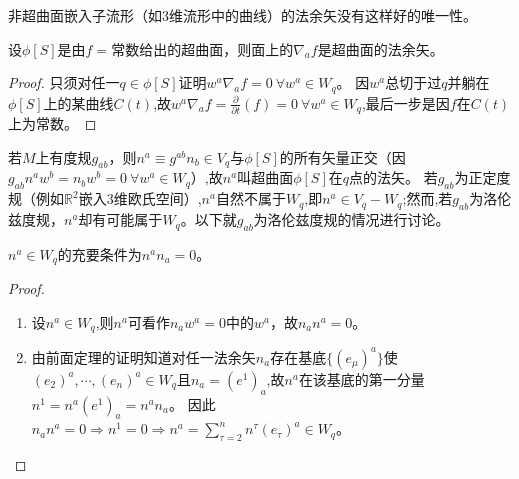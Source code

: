 \begin{note}
	非超曲面嵌入子流形（如$3$维流形中的曲线）的法余矢没有这样好的唯一性。
\end{note}

\begin{theorem}
	设$\phi[S]$是由$f = \text{常数}$给出的超曲面，则面上的$\nabla_af$是超曲面的法余矢。
\end{theorem}

\begin{proof}
	只须对任一$q \in \phi[S]$证明$w^a\nabla_af = 0 ~ \forall w^a \in W_q$。
	因$w^a$总切于过$q$并躺在$\phi[S]$上的某曲线$C(t)$,故$w^a\nabla_af = \frac{\partial}{\partial t}(f) = 0 ~ \forall w^a \in W_q$,最后一步是因$f$在$C(t)$上为常数。
\end{proof}

若$M$上有度规$g_{ab}$，则$n^a \equiv g^{ab}n_b \in V_q$与$\phi[S]$的所有矢量正交（因$g_{ab}n^aw^b = n_bw^b = 0 ~ \forall w^a \in W_q$）,故$n^a$叫超曲面$\phi[S]$在$q$点的法矢。
若$g_{ab}$为正定度规（例如$\mathbb{R}^2$嵌入$3$维欧氏空间）,$n^a$自然不属于$W_q$,即$n^a \in V_q - W_q$;然而,若$g_{ab}$为洛伦兹度规，$n^a$却有可能属于$W_q$。以下就$g_{ab}$为洛伦兹度规的情况进行讨论。

\begin{theorem}
	$n^a \in W_q$的充要条件为$n^an_a = 0$。
\end{theorem}

\begin{proof}
	\begin{enumerate}[（A）]
		\item 设$n^a \in W_q$,则$n^a$可看作$n_aw^a = 0$中的$w^a$，故$n_an^a = 0$。
		\item 由前面定理的证明知道对任一法余矢$n_a$存在基底$\{(e_\mu)^a\}$使$(e_2)^a, \cdots, (e_n)^a \in W_q$且$n_a = (e^1)_a$,故$n^a$在该基底的第一分量$n^1 = n^a(e^1)_a = n^an_a$。
		      因此$n_an^a = 0 \Rightarrow n^1 = 0 \Rightarrow n^a = \sum^n_{\tau = 2}n^\tau(e_\tau)^a \in W_q$。
	\end{enumerate}
\end{proof}
